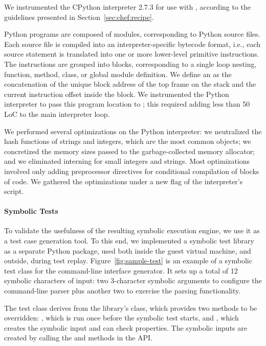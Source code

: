 We instrumented the CPython interpreter 2.7.3 for use with \chef, according to the guidelines presented in Section~\ref{sec:chef:recipe}.

Python programs are composed of modules, corresponding to Python source files.  Each source file is compiled into an interpreter-specific bytecode format, i.e., each source statement is translated into one or more lower-level primitive instructions.  The instructions are grouped into blocks, corresponding to a single loop nesting, function, method, class, or global module definition.
%
We define an \hlpc as the concatenation of the unique block address of the top frame on the stack and the current instruction offset inside the block. We instrumented the Python interpreter to pass this program location to \chef; this required adding less than 50 LoC to the main interpreter loop.

We performed several optimizations on the Python interpreter: we neutralized the hash functions of strings and integers, which are the most common objects; we concretized the memory sizes passed to the garbage-collected memory allocator; and we eliminated interning for small integers and strings.    
%
Most optimizations involved only adding preprocessor directives for conditional compilation of blocks of code.
%
We gathered the optimizations under a new  flag of the interpreter's  script.

\paragraph{Symbolic Tests}

To validate the usefulness of the resulting symbolic execution engine, we use it as a test case generation tool.  To this end, we implemented a symbolic test library as a separate Python package, used both inside the guest virtual machine, and outside, during test replay.
%
Figure~\ref{fig:sample-test} is an example of a symbolic test class for the  command-line interface generator. It sets up a total of 12 symbolic characters of input: two 3-character symbolic arguments to configure the command-line parser plus another two to exercise the parsing functionality.

The test class derives from the library's  class, which provides two methods to be overridden: , which is run once before the symbolic test starts, and , which creates the symbolic input and can check properties.  The symbolic inputs are created by calling the  and  methods in the  API.

